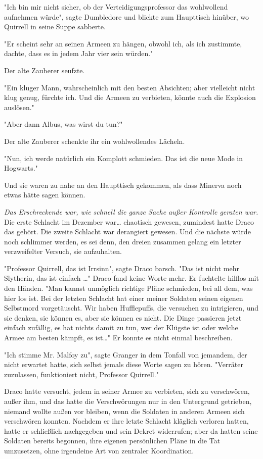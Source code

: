{"Ich bin mir nicht sicher, ob der Verteidigungsprofessor das wohlwollend aufnehmen würde", sagte Dumbledore und blickte zum Haupttisch hinüber, wo Quirrell in seine Suppe sabberte.

"Er scheint sehr an seinen Armeen zu hängen, obwohl ich, als ich zustimmte, dachte, dass es in jedem Jahr vier sein würden."

Der alte Zauberer seufzte.

"Ein kluger Mann, wahrscheinlich mit den besten Absichten; aber vielleicht nicht klug genug, fürchte ich. Und die Armeen zu verbieten, könnte auch die Explosion auslösen."

"Aber dann Albus, was wirst du tun?"

Der alte Zauberer schenkte ihr ein wohlwollendes Lächeln.

"Nun, ich werde natürlich ein Komplott schmieden. Das ist die neue Mode in Hogwarts."

Und sie waren zu nahe an den Haupttisch gekommen, als dass Minerva noch etwas hätte sagen können.

\emph{Das Erschreckende war, wie schnell die ganze Sache außer Kontrolle geraten war.} Die erste Schlacht im Dezember war… chaotisch gewesen, zumindest hatte Draco das gehört. Die zweite Schlacht war derangiert gewesen. Und die nächste würde noch schlimmer werden, es sei denn, den dreien zusammen gelang ein letzter verzweifelter Versuch, sie aufzuhalten.

"Professor Quirrell, das ist Irrsinn", sagte Draco barsch. "Das ist nicht mehr Slytherin, das ist einfach …" Draco fand keine Worte mehr. Er fuchtelte hilflos mit den Händen. "Man kannst unmöglich richtige Pläne schmieden, bei all dem, was hier los ist. Bei der letzten Schlacht hat einer meiner Soldaten seinen eigenen Selbstmord vorgetäuscht. Wir haben Hufflepuffs, die versuchen zu intrigieren, und sie denken, sie können es, aber sie können es nicht. Die Dinge passieren jetzt einfach zufällig, es hat nichts damit zu tun, wer der Klügste ist oder welche Armee am besten kämpft, es ist…" Er konnte es nicht einmal beschreiben.

"Ich stimme Mr. Malfoy zu", sagte Granger in dem Tonfall von jemandem, der nicht erwartet hatte, sich selbst jemals diese Worte sagen zu hören. "Verräter zuzulassen, funktioniert nicht, Professor Quirrell."

Draco hatte versucht, jedem in seiner Armee zu verbieten, sich zu verschwören, außer ihm, und das hatte die Verschwörungen nur in den Untergrund getrieben, niemand wollte außen vor bleiben, wenn die Soldaten in anderen Armeen sich verschwören konnten. Nachdem er ihre letzte Schlacht kläglich verloren hatten, hatte er schließlich nachgegeben und sein Dekret widerrufen; aber da hatten seine Soldaten bereits begonnen, ihre eigenen persönlichen Pläne in die Tat umzusetzen, ohne irgendeine Art von zentraler Koordination.

}
